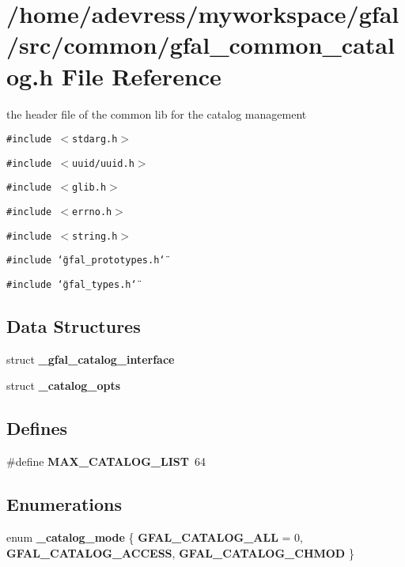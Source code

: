 \section{/home/adevress/myworkspace/gfal/src/common/gfal\_\-common\_\-catalog.h File Reference}
\label{gfal__common__catalog_8h}
the header file of the common lib for the catalog management 

{\tt \#include $<$stdarg.h$>$}\par
{\tt \#include $<$uuid/uuid.h$>$}\par
{\tt \#include $<$glib.h$>$}\par
{\tt \#include $<$errno.h$>$}\par
{\tt \#include $<$string.h$>$}\par
{\tt \#include \char`\"{}gfal\_\-prototypes.h\char`\"{}}\par
{\tt \#include \char`\"{}gfal\_\-types.h\char`\"{}}\par
\subsection*{Data Structures}
\begin{CompactItemize}
\item 
struct \textbf{\_\-gfal\_\-catalog\_\-interface}
\item 
struct \bf{\_\-catalog\_\-opts}
\end{CompactItemize}
\subsection*{Defines}
\begin{CompactItemize}
\item 
\#define \textbf{MAX\_\-CATALOG\_\-LIST}~64\label{gfal__common__catalog_8h_c39f705683e893b91f559704ee2a707e}

\end{CompactItemize}
\subsection*{Enumerations}
\begin{CompactItemize}
\item 
enum \textbf{\_\-catalog\_\-mode} \{ \textbf{GFAL\_\-CATALOG\_\-ALL} = 0, 
\textbf{GFAL\_\-CATALOG\_\-ACCESS}, 
\textbf{GFAL\_\-CATALOG\_\-CHMOD}
 \}
\end{CompactItemize}
